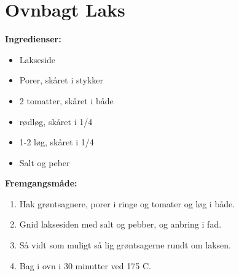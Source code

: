\documentclass{book}
\begin{document}
\newpage \section{Ovnbagt Laks}
\begin{minipage}[t] {0.5\textwidth}
\textbf{Ingredienser:}
    \begin{itemize}
        \item Lakseside
        \item Porer, skåret i stykker
        \item 2 tomatter, skåret i både
        \item rødløg, skåret i 1/4
        \item 1-2 løg, skåret i 1/4
        \item Salt og peber
    \end{itemize}
\end{minipage}
\begin{minipage}[t] {0.5\textwidth}
\textbf{Fremgangsmåde:}
\begin{enumerate}
    \item Hak grøntsagnere, porer i ringe og tomater og løg i både.
    \item Gnid laksesiden med salt og pebber, og anbring i fad.
    \item Så vidt som muligt så lig grøntsagerne rundt om laksen.
    \item Bag i ovn i 30 minutter ved 175 \degree C.
\end{enumerate}
\end{minipage}
\newpage 
\end{document}
